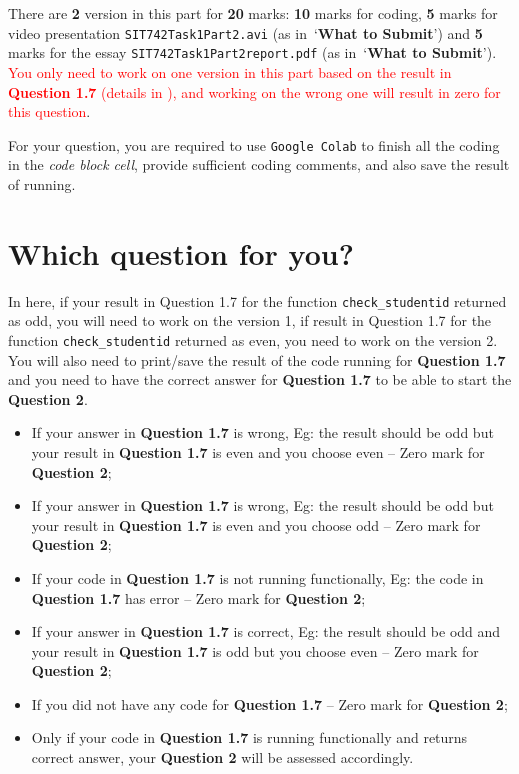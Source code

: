 \documentclass[a4paper]{article}
\begin{document}
    There are \textbf{2} version in this part for \textbf{20} marks:
    \textbf{10} marks for coding, \textbf{5} marks for video presentation \texttt{SIT742Task1Part2.avi}
    (as in~`\textbf{What to Submit}')
    and \textbf{5} marks for the essay \texttt{SIT742Task1Part2report.pdf} (as in~`\textbf{What to Submit}').
    \textcolor{red}{You only need to work on one version in this part
    based on the result in \textbf{Question 1.7} (details in ), and working on the wrong one will result in zero for this question}.

    For your question,
    you are required to use \texttt{Google Colab}
    to finish all the coding in the \textit{code block cell},
    provide sufficient coding comments,
    and also save the result of running.

    \section{Which question for you?}\label{sec-which}

    In here,
    if your result in Question 1.7 for the function \texttt{check_studentid} returned as odd, you will need to work on the version 1, if result in Question 1.7 for the function \texttt{check_studentid} returned as even, you need to work on the version 2.
    You will also need to print/save the result of the code running for \textbf{Question 1.7} and you need to have the correct answer for \textbf{Question 1.7} to be able to start the \textbf{Question 2}.

    \begin{itemize}
        \item If your answer in \textbf{Question 1.7} is wrong, Eg: the result should be odd but your result in \textbf{Question 1.7} is even and you choose even -- Zero mark for \textbf{Question 2};
        \item If your answer in \textbf{Question 1.7} is wrong, Eg: the result should be odd but your result in \textbf{Question 1.7} is even and you choose odd -- Zero mark for \textbf{Question 2};
        \item If your code in \textbf{Question 1.7} is not running functionally, Eg: the code in \textbf{Question 1.7} has error -- Zero mark for \textbf{Question 2};
        \item If your answer in \textbf{Question 1.7} is correct, Eg: the result should be odd and your result in \textbf{Question 1.7} is odd but you choose even -- Zero mark for \textbf{Question 2};
        \item If you did not have any code for \textbf{Question 1.7} -- Zero mark for \textbf{Question 2};
        \item Only if your code in \textbf{Question 1.7} is running functionally and returns correct answer, your \textbf{Question 2} will be assessed accordingly.
    \end{itemize}
\end{document}
